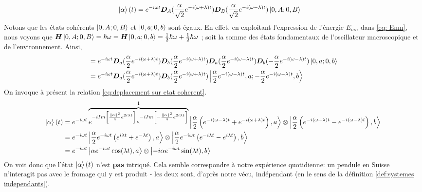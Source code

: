 \documentclass[11pt,oneside,a4paper]{article}
\newcommand{\h}{\ensuremath{\hbar}}
\begin{document}
\begin{align*}
  \ket{\alpha}(t) &= e^{-i\omega t}\bm{D}_A(\frac{\alpha}{\sqrt{2}}e^{-i\left(\omega+\lambda\right)t})\bm{D}_B(\frac{\alpha}{\sqrt{2}}e^{-i\left(\omega-\lambda\right)t})\ket{0,A;0,B}
\end{align*}
\color{purple} Notons que les états cohérents $\ket{0,A;0,B}$ et $\ket{0,a;0,b}$ sont égaux. En effet, en exploitant l'expression de l'énergie $E_{mn}$ dans \eqref{eq: Emn}, nous voyons que $\bm{H}\ket{0,A;0,B} = \h\omega = \bm{H}\ket{0,a;0,b} = \frac{1}{2}\h\omega+\frac{1}{2}\h\omega$ ; soit la somme des états fondamentaux de l'oscillateur macroscopique et de l'environnement. Ainsi, \color{black}
\begin{align*}
  &= e^{-i\omega t}\bm{D}_a(\frac{\alpha}{2}e^{-i\left(\omega+\lambda\right)t})\bm{D}_b(\frac{\alpha}{2}e^{-i\left(\omega+\lambda\right)t})\bm{D}_a(\frac{\alpha}{2}e^{-i\left(\omega-\lambda\right)t})\bm{D}_b(-\frac{\alpha}{2}e^{-i\left(\omega-\lambda\right)t})\ket{0,a;0,b}\\
  &= e^{-i\omega t}\bm{D}_a(\frac{\alpha}{2}e^{-i\left(\omega+\lambda\right)t})\bm{D}_b(\frac{\alpha}{2}e^{-i\left(\omega+\lambda\right)t})\ket{\frac{\alpha}{2}e^{-i\left(\omega-\lambda\right)t},a;-\frac{\alpha}{2}e^{-i\left(\omega-\lambda\right)t},b}
\end{align*}
On invoque à présent la relation \eqref{eq:deplacement sur etat coherent}.
\begin{align}
  \ket{\alpha}(t) &= e^{-i\omega t}\overbrace{e^{-iIm\left[\frac{\norm{\alpha}^2}{4}e^{2i\lambda t}\right]}e^{-iIm\left[-\frac{\norm{\alpha}^2}{4}e^{2i\lambda t}\right]}}^1\ket{\frac{\alpha}{2}\left(e^{-i\left(\omega-\lambda\right)t}+e^{-i\left(\omega+\lambda\right)t}\right),a}\otimes\ket{\frac{\alpha}{2}\left(e^{-i\left(\omega+\lambda\right)t}-e^{-i\left(\omega-\lambda\right)t}\right),b}\notag\\
  &= e^{-i\omega t}\ket{\frac{\alpha}{2}e^{-i\omega t}\left(e^{i\lambda t}+e^{-\lambda t}\right),a}\otimes\ket{\frac{\alpha}{2}e^{-i\omega t}\left(e^{-i\lambda t}-e^{i\lambda t}\right),b}\notag\\
  &= e^{-i\omega t}\ket{\alpha e^{-i\omega t}\cos(\lambda t),a}\otimes\ket{-i\alpha e^{-i\omega t}\sin(\lambda t),b}\label{eq:etat naif evolue}
\end{align}
On voit donc que l'état $\ket{\alpha}(t)$ n'est \textbf{pas} intriqué. Cela semble correspondre à notre expérience quotidienne: un pendule en Suisse n'interagit pas avec le fromage qui y est produit - les deux sont, d'après notre vécu, indépendant (en le sens de la définition \ref{def:systemes independants}).
\end{document}
